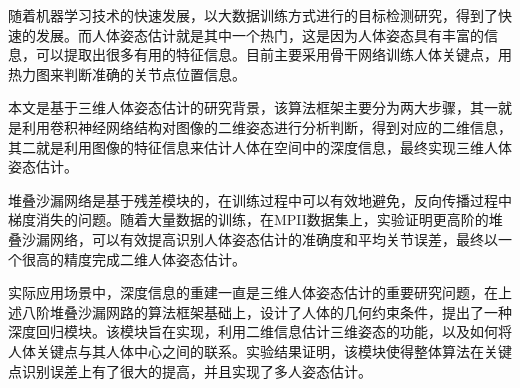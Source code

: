 	
\begin{chineseabstract}

随着机器学习技术的快速发展，以大数据训练方式进行的目标检测研究，得到了快速的发展。而人体姿态估计就是其中一个热门，这是因为人体姿态具有丰富的信息，可以提取出很多有用的特征信息。目前主要采用骨干网络训练人体关键点，用热力图来判断准确的关节点位置信息。

本文是基于三维人体姿态估计的研究背景，该算法框架主要分为两大步骤，其一就是利用卷积神经网络结构对图像的二维姿态进行分析判断，得到对应的二维信息，其二就是利用图像的特征信息来估计人体在空间中的深度信息，最终实现三维人体姿态估计。

堆叠沙漏网络是基于残差模块的，在训练过程中可以有效地避免，反向传播过程中梯度消失的问题。随着大量数据的训练，在MPII数据集上，实验证明更高阶的堆叠沙漏网络，可以有效提高识别人体姿态估计的准确度和平均关节误差，最终以一个很高的精度完成二维人体姿态估计。

实际应用场景中，深度信息的重建一直是三维人体姿态估计的重要研究问题，在上述八阶堆叠沙漏网路的算法框架基础上，设计了人体的几何约束条件，提出了一种深度回归模块。该模块旨在实现，利用二维信息估计三维姿态的功能，以及如何将人体关键点与其人体中心之间的联系。实验结果证明，该模块使得整体算法在关键点识别误差上有了很大的提高，并且实现了多人姿态估计。

\end{chineseabstract}

